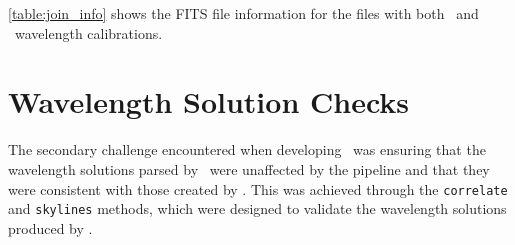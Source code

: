 

\autoref{table:join_info} shows the \gls{FITS} file information for the files with both \polsalt\ and \iraf\ wavelength calibrations. %







\section{Wavelength Solution Checks} \label{sec:test_wav}

The secondary challenge encountered when developing \stops\ was ensuring that the wavelength solutions parsed by \stops\ were unaffected by the pipeline and that they were consistent with those created by \polsalt. This was achieved through the \texttt{correlate} and \texttt{skylines} methods, which were designed to validate the wavelength solutions produced by \iraf.

